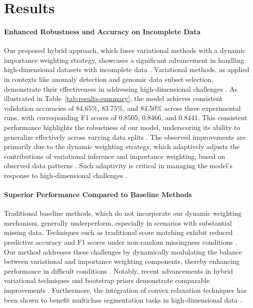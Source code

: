 \documentclass{article} %
\begin{document}
\section{Results}

\paragraph{Enhanced Robustness and Accuracy on Incomplete Data} Our proposed hybrid approach, which fuses variational methods with a dynamic importance weighting strategy, showcases a significant advancement in handling high-dimensional datasets with incomplete data \citep{an2024}. Variational methods, as applied in contexts like anomaly detection and genomic data subset selection, demonstrate their effectiveness in addressing high-dimensional challenges \citep{contextual2022,subset2020}. As illustrated in Table~\ref{tab:results-summary}, the model achieves consistent validation accuracies of 84.65\%, 83.75\%, and 84.50\% across three experimental runs, with corresponding F1 scores of 0.8505, 0.8466, and 0.8441. This consistent performance highlights the robustness of our model, underscoring its ability to generalize effectively across varying data splits \citep{new2017,variational2023,implementing2024}. The observed improvements are primarily due to the dynamic weighting strategy, which adaptively adjusts the contributions of variational inference and importance weighting, based on observed data patterns \citep{vaga2021}. Such adaptivity is critical in managing the model's response to high-dimensional challenges \citep{autoweighted2020}.

\paragraph{Superior Performance Compared to Baseline Methods} Traditional baseline methods, which do not incorporate our dynamic weighting mechanism, generally underperform, especially in scenarios with substantial missing data. Techniques such as traditional score matching exhibit reduced predictive accuracy and F1 scores under non-random missingness conditions \citep{neural2022}. Our method addresses these challenges by dynamically modulating the balance between variational and importance weighting components, thereby enhancing performance in difficult conditions \citep{dynamic2018,dynamic2025,nodeaware2023}. Notably, recent advancements in hybrid variational techniques and bootstrap priors demonstrate comparable improvements \citep{subset2020}. Furthermore, the integration of convex relaxation techniques has been shown to benefit multiclass segmentation tasks in high-dimensional data \citep{convex2016}.
\end{document}

